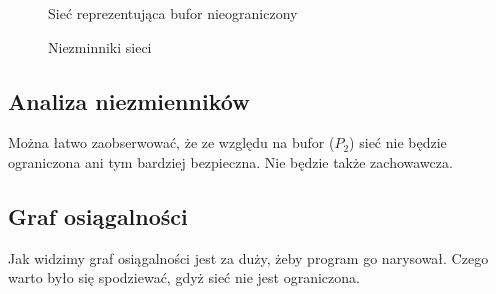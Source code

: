 \begin{figure}[h!]
	\caption{Sieć reprezentująca bufor nieograniczony}
	\label{zad2:graph1}
\end{figure}

\begin{figure}[h!]
	\caption{Niezminniki sieci}
	\label{zad2:graph1}
\end{figure}

\subsection{Analiza niezmienników}
Można łatwo zaobserwować, że ze względu na bufor ($P_2$) sieć nie będzie ograniczona 
ani tym bardziej bezpieczna. 
Nie będzie także zachowawcza.

\subsection{Graf osiągalności}
Jak widzimy graf osiągalności jest za duży, żeby program go narysował. 
Czego warto było się spodziewać, gdyż sieć nie jest ograniczona.